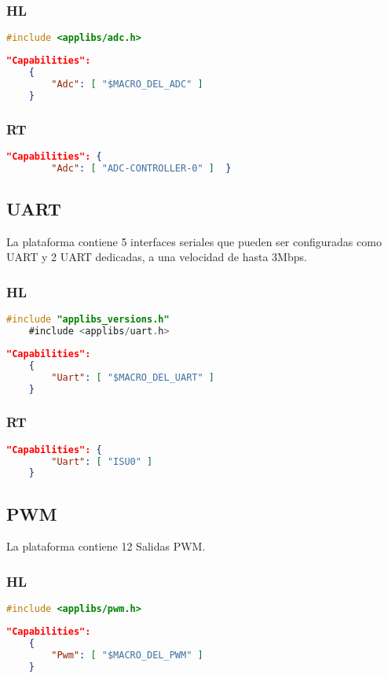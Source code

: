 \subsubsection{HL}
\begin{lstlisting}[language = C, firstnumber=0]
	#include <applibs/adc.h>
\end{lstlisting}
\begin{lstlisting}[language = json, firstnumber=0]	
	"Capabilities": 
	{  
		"Adc": [ "$MACRO_DEL_ADC" ] 
	}
\end{lstlisting}
\subsubsection{RT}
\begin{lstlisting}[language = json, firstnumber=0]	
	"Capabilities": {
		"Adc": [ "ADC-CONTROLLER-0" ]  }
\end{lstlisting}

\subsection{UART}
La plataforma contiene 5 interfaces seriales que pueden ser configuradas como UART y 2 UART dedicadas, a una velocidad de hasta 3Mbps.
\subsubsection{HL}
\begin{lstlisting}[language = C, firstnumber=0]
	#include "applibs_versions.h"
	#include <applibs/uart.h>
\end{lstlisting}
\begin{lstlisting}[language = json, firstnumber=0]	
	"Capabilities": 
	{  
		"Uart": [ "$MACRO_DEL_UART" ] 
	}
\end{lstlisting}
\subsubsection{RT}
\begin{lstlisting}[language = json, firstnumber=0]	
	"Capabilities": {
		"Uart": [ "ISU0" ]
	}
\end{lstlisting}

\subsection{PWM}
La plataforma contiene 12 Salidas PWM.
\subsubsection{HL}
\begin{lstlisting}[language = C, firstnumber=0]
	#include <applibs/pwm.h>
\end{lstlisting}
\begin{lstlisting}[language = json, firstnumber=0]	
	"Capabilities": 
	{  
		"Pwm": [ "$MACRO_DEL_PWM" ] 
	}
\end{lstlisting}
